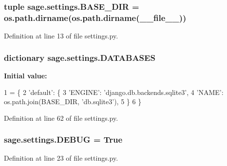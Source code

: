\subsubsection[{B\+A\+S\+E\+\_\+\+D\+I\+R}]{\setlength{\rightskip}{0pt plus 5cm}tuple sage.\+settings.\+B\+A\+S\+E\+\_\+\+D\+I\+R = os.\+path.\+dirname(os.\+path.\+dirname(\+\_\+\+\_\+file\+\_\+\+\_\+))}\label{namespacesage_1_1settings_add6d83672b1137d74a06bf1606aecf04}


Definition at line 13 of file settings.\+py.

\hypertarget{namespacesage_1_1settings_a870c10acdd1141ac92340ce3e50ffbbd}{}
\subsubsection[{D\+A\+T\+A\+B\+A\+S\+E\+S}]{\setlength{\rightskip}{0pt plus 5cm}dictionary sage.\+settings.\+D\+A\+T\+A\+B\+A\+S\+E\+S}\label{namespacesage_1_1settings_a870c10acdd1141ac92340ce3e50ffbbd}
{\bfseries Initial value\+:}
\begin{DoxyCode}
1 = \{
2     \textcolor{stringliteral}{'default'}: \{
3         \textcolor{stringliteral}{'ENGINE'}: \textcolor{stringliteral}{'django.db.backends.sqlite3'},
4         \textcolor{stringliteral}{'NAME'}: os.path.join(BASE\_DIR, \textcolor{stringliteral}{'db.sqlite3'}),
5     \}
6 \}
\end{DoxyCode}


Definition at line 62 of file settings.\+py.

\hypertarget{namespacesage_1_1settings_acc28086c56df6aed910b2552e07944cc}{}
\subsubsection[{D\+E\+B\+U\+G}]{\setlength{\rightskip}{0pt plus 5cm}sage.\+settings.\+D\+E\+B\+U\+G = True}\label{namespacesage_1_1settings_acc28086c56df6aed910b2552e07944cc}


Definition at line 23 of file settings.\+py.

\hypertarget{namespacesage_1_1settings_a6517c4f93850d63e2bdbe7040ad0e2ff}{}
